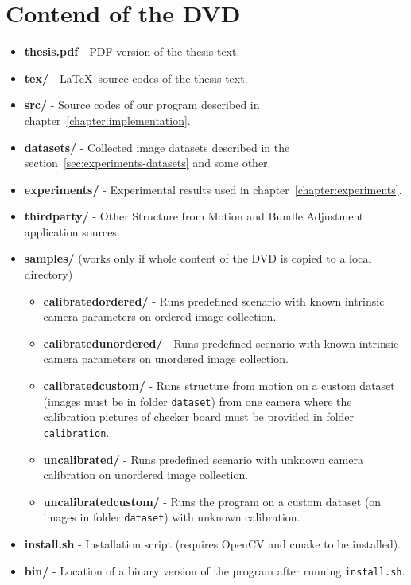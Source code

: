 \chapter{Contend of the DVD}
\begin{itemize}
	\item \textbf{thesis.pdf} - PDF version of the thesis text.
	\item \textbf{tex/} - \LaTeX ~source codes of the thesis text.
	\item \textbf{src/} - Source codes of our program described in chapter~\ref{chapter:implementation}.
	\item \textbf{datasets/} - Collected image datasets described in the section~\ref{sec:experiments-datasets} and some other.
	\item \textbf{experiments/} - Experimental results used in chapter~\ref{chapter:experiments}.
	\item \textbf{third\textunderscore party/} - Other Structure from Motion and Bundle Adjustment application sources.
	\item \textbf{samples/} (works only if whole content of the DVD is copied to a local directory)
	\begin{itemize}
		\item \textbf{calibrated\textunderscore ordered/} - Runs predefined scenario with known intrinsic camera parameters on ordered image collection.
		\item \textbf{calibrated\textunderscore unordered/} - Runs predefined scenario with known intrinsic camera parameters on unordered image collection.
		\item \textbf{calibrated\textunderscore custom/} - Runs structure from motion on a custom dataset (images must be in folder \texttt{dataset}) from one camera where the calibration pictures of checker board must be provided in folder \texttt{calibration}.
		\item \textbf{uncalibrated/} - Runs predefined scenario with unknown camera calibration on unordered image collection.
		\item \textbf{uncalibrated\textunderscore custom/} - Runs the program on a custom dataset (on images in folder \texttt{dataset}) with unknown calibration.
	\end{itemize}
	\item \textbf{install.sh} - Installation script (requires OpenCV and cmake to be installed).
	\item \textbf{bin/} - Location of a binary version of the program after running \texttt{install.sh}.
\end{itemize}
